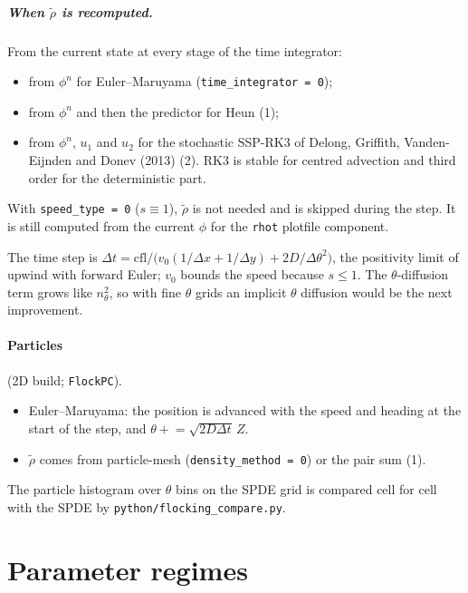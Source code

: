 \documentclass[11pt]{article}
\newcommand{\code}[1]{\texttt{#1}}
\newcommand{\rt}{\tilde\rho}
\begin{document}
\subparagraph{When $\rt$ is recomputed.} From the current state at every stage
of the time integrator:
\begin{itemize}[nosep]
  \item from $\phi^n$ for Euler--Maruyama (\code{time\_integrator = 0});
  \item from $\phi^n$ and then the predictor for Heun (1);
  \item from $\phi^n$, $u_1$ and $u_2$ for the stochastic SSP-RK3 of Delong,
        Griffith, Vanden-Eijnden and Donev (2013) (2). RK3 is stable for
        centred advection and third order for the deterministic part.
\end{itemize}
With \code{speed\_type = 0} ($s\equiv1$), $\rt$ is not needed and is skipped
during the step. It is still computed from the current $\phi$ for the
\code{rhot} plotfile component.

The time step is $\Delta t = \mathrm{cfl}/\bigl(v_0(1/\Delta x+1/\Delta y)
+ 2D/\Delta\theta^2\bigr)$, the positivity limit of upwind with forward
Euler; $v_0$ bounds the speed because $s\le1$. The $\theta$-diffusion term
grows like $n_\theta^2$, so with fine $\theta$ grids an implicit $\theta$
diffusion would be the next improvement.

\paragraph{Particles} (2D build; \code{FlockPC}).
\begin{itemize}
  \item Euler--Maruyama: the position is advanced with the speed and heading
        at the start of the step, and $\theta \mathrel{+}= \sqrt{2D\Delta t}\,Z$.
  \item $\rt$ comes from particle-mesh (\code{density\_method = 0}) or the
        pair sum (1).
\end{itemize}
The particle histogram over $\theta$ bins on the SPDE grid is compared cell
for cell with the SPDE by \code{python/flocking\_compare.py}.

\section{Parameter regimes}
\end{document}
